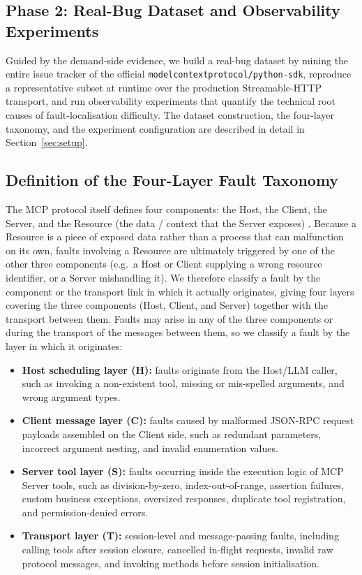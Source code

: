 \subsection{Phase 2: Real-Bug Dataset and Observability Experiments}

Guided by the demand-side evidence, we build a real-bug dataset by mining the entire issue
tracker of the official \verb|modelcontextprotocol/python-sdk|, reproduce a representative
subset at runtime over the production Streamable-HTTP transport, and run observability
experiments that quantify the technical root causes of fault-localisation difficulty. The
dataset construction, the four-layer taxonomy, and the experiment configuration are described
in detail in Section~\ref{sec:setup}.

\subsection{Definition of the Four-Layer Fault Taxonomy}\label{sec:taxonomy}

The MCP protocol itself defines four components: the Host, the Client, the Server, and the
Resource (the data / context that the Server exposes) \cite{yang2025survey}. Because a Resource is
a piece of exposed data rather than a process that can malfunction on its own, faults involving a
Resource are ultimately triggered by one of the other three components (e.g.\ a Host or Client
supplying a wrong resource identifier, or a Server mishandling it). We therefore classify a fault
by the component or the transport link in which it actually originates, giving four layers covering
the three components (Host, Client, and Server) together with the transport between them. Faults may
arise in any of the three components or during the transport of the messages between them, so we
classify a fault by the layer in which it originates:

\begin{itemize}
  \item \textbf{Host scheduling layer (H):} faults originate from the Host/LLM caller,
        such as invoking a non-existent tool, missing or mis-spelled arguments, and wrong
        argument types.
  \item \textbf{Client message layer (C):} faults caused by malformed JSON-RPC request
        payloads assembled on the Client side, such as redundant parameters, incorrect
        argument nesting, and invalid enumeration values.
  \item \textbf{Server tool layer (S):} faults occurring inside the execution logic of MCP
        Server tools, such as division-by-zero, index-out-of-range, assertion failures,
        custom business exceptions, oversized responses, duplicate tool registration, and
        permission-denied errors.
  \item \textbf{Transport layer (T):} session-level and message-passing faults, including
        calling tools after session closure, cancelled in-flight requests, invalid raw
        protocol messages, and invoking methods before session initialisation.
\end{itemize}

